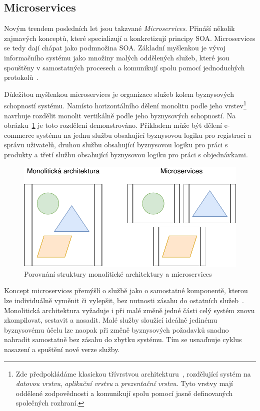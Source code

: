 \subsection{Microservices}

Novým trendem posledních let jsou takzvané \textit{Microservices}.
Přináší několik zajmavých konceptů, které specializují a konkretizují
principy SOA. Microservices se tedy dají chápat jako podmnožina
SOA. Základní myšlenkou je vývoj informačního systému jako množiny
malých oddělených služeb, které jsou spouštěny v samostatných procesech
a komunikují spolu pomocí jednoduchých protokolů~\cite{lewis2014microservices}.

Důležitou myšlenkou microservices je organizace služeb kolem
byznysových schopností systému. Namísto horizontálního dělení monolitu
podle jeho vrstev\footnote{
Zde předpokládáme klasickou třívrstvou architekturu~\cite{fowler2002patterns},
rozdělující systém na \textit{datovou vrstvu}, \textit{aplikační vrstvu}
a \textit{prezentační vrstvu}. Tyto vrstvy mají oddělené zodpovědnosti a komunikují
spolu pomocí jasně definovaných společných rozhraní.
} navrhuje rozdělit monolit vertikálně podle jeho byznysových schopností.
Na obrázku~\ref{fig:monolith-vs-microservices} je toto rozdělení demonstrováno.
Příkladem může být dělení e-commerce systému na jednu službu obsahující byznysovou
logiku pro registraci a správu uživatelů, druhou službu obsahující byznysovou logiku
pro práci s produkty a třetí službu obsahující byznysovou logiku pro práci
s objednávkami.

\begin{figure}
    \centering
    \includegraphics[keepaspectratio=true, width=0.5\linewidth]{figures/monolith-vs-microservices.pdf}
    \caption{Porovnání struktury monolitické architektury a microservices}
    \label{fig:monolith-vs-microservices}
\end{figure}

Koncept microservices přemýšlí o službě jako o samostatné komponentě,
kterou lze individuálně vyměnit či vylepšit, bez nutnosti zásahu do
ostatních služeb~\cite{lewis2014microservices}. Monolitická architektura
vyžaduje i při malé změně jedné části celý systém znovu zkompilovat, sestavit
a nasadit. Malé služby sloužící ideálně jedinému byznysovému účelu lze naopak
při změně byznysových požadavků snadno nahradit samostatně bez zásahu do zbytku
systému. Tím se usnaďnuje cyklus nasazení a spuštění nové verze služby.


